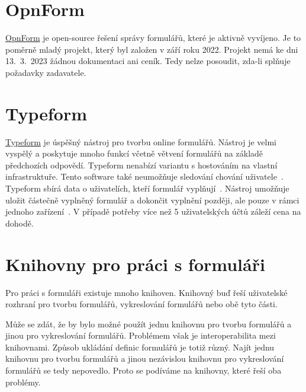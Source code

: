 \section*{OpnForm}\label{sec:opnform}

\href{https://opnform.com/}{OpnForm} je open-source řešení správy formulářů, které je aktivně vyvíjeno.
Je to poměrně mladý projekt, který byl založen v září roku 2022.
Projekt nemá ke dni 13.~3.~2023 žádnou dokumentaci ani ceník.
Tedy nelze posoudit, zda-li splňuje požadavky zadavatele.

\section*{Typeform}\label{sec:typeform}

\href{https://www.typeform.com/}{Typeform} je úspěšný nástroj pro tvorbu online formulářů.
Nástroj je velmi vyspělý a poskytuje mnoho funkcí včetně větvení formulářů na základě předchozích odpovědí.
Typeform nenabízí variantu s hostováním na vlastní infrastruktuře.
Tento software také neumožňuje sledování chování uživatele~\cite{user-tracking-typeform}.
Typeform sbírá data o uživatelích, kteří formulář vyplňují~\cite{user-data-typeform}.
Nástroj umožňuje uložit částečně vyplněný formulář a dokončit vyplnění později, ale pouze v rámci jednoho zařízení~\cite{save-and-return-typeform}.
V případě potřeby více než 5 uživatelských účtů záleží cena na dohodě.

\section*{Knihovny pro práci s formuláři}\label{sec:knihovny-pro-praci-s-formulari}

Pro práci s formuláři existuje mnoho knihoven.
Knihovný buď řeší uživatelské rozhraní pro tvorbu formulářů, vykreslování formulářů nebo obě tyto části.

Může se zdát, že by bylo možné použít jednu knihovnu pro tvorbu formulářů a jinou pro vykreslování formulářů.
Problémem však je interoperabilita mezi knihovnami.
Způsob ukládání definic formulářů je totiž různý.
Najít jednu knihovnu pro tvorbu formulářů a jinou nezávislou knihovnu pro vykreslování formulářů se tedy nepovedlo.
Proto se podíváme na knihovny, které řeší oba problémy.

